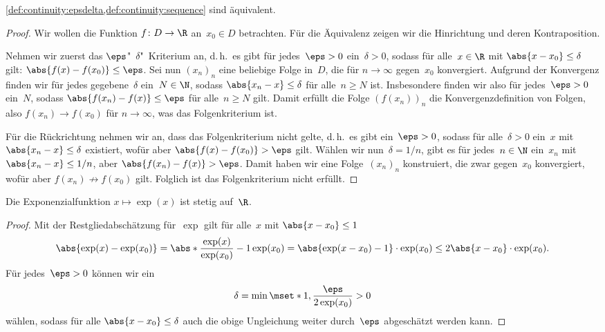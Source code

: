 \documentclass[a4paper]{article}
\begin{document}
\begin{theorem}
    \cref{def:continuity:epsdelta,def:continuity:sequence} sind äquivalent.
\end{theorem}

\begin{proof}
    Wir wollen die Funktion $f\colon D \to \R$ an~$x_0 \in D$ betrachten. Für die Äquivalenz zeigen wir die Hinrichtung und deren Kontraposition.

    Nehmen wir zuerst das $\eps$"~$\delta$"~Kriterium an, d.\,h.\ es gibt für jedes~$\eps > 0$ ein~$\delta > 0$, sodass für alle~$x \in \R$ mit $\abs{x-x_0} \leq \delta$ gilt: $\abs{f(x)-f(x_0)} \leq \eps$. Sei nun $(x_n)_n$ eine beliebige Folge in~$D$, die für $n \to \infty$ gegen~$x_0$ konvergiert. Aufgrund der Konvergenz finden wir für jedes gegebene~$\delta$ ein~$N \in \N$, sodass $\abs{x_n-x} \leq \delta$ für alle~$n \geq N$ ist. Insbesondere finden wir also für jedes~$\eps > 0$ ein~$N$, sodass $\abs{f(x_n)-f(x)} \leq \eps$ für alle~$n \geq N$ gilt. Damit erfüllt die Folge $(f(x_n))_n$ die Konvergenzdefinition von Folgen, also $f(x_n) \to f(x_0)$ für $n \to \infty$, was das Folgenkriterium ist.

    Für die Rückrichtung nehmen wir an, dass das Folgenkriterium nicht gelte, d.\,h.\ es gibt ein~$\eps > 0$, sodass für alle~$\delta > 0$ ein~$x$ mit $\abs{x_n-x} \leq \delta$ existiert, wofür aber $\abs{f(x)-f(x_0)} > \eps$ gilt. Wählen wir nun~$\delta = 1/n$, gibt es für jedes~$n \in \N$ ein~$x_n$ mit $\abs{x_n-x} \leq 1/n$, aber $\abs{f(x_n)-f(x)} > \eps$. Damit haben wir eine Folge~$(x_n)_n$ konstruiert, die zwar gegen~$x_0$ konvergiert, wofür aber $f(x_n) \not\to f(x_0)$ gilt. Folglich ist das Folgenkriterium nicht erfüllt.
\end{proof}

\begin{proposition}
    Die Exponenzialfunktion $x \mapsto \exp(x)$ ist stetig auf~$\R$.
\end{proposition}

\begin{proof}
    Mit der Restgliedabschätzung für~$\exp$ gilt für alle~$x$ mit $\abs{x-x_0} \leq 1$
    \begin{equation*}
        \abs{\exp(x)-\exp(x_0)} = \abs*{\frac{\exp(x)}{\exp(x_0)} - 1} \exp(x_0) = \abs{\exp(x-x_0)-1} \cdot \exp(x_0) \leq  2\abs{x-x_0} \cdot \exp(x_0).
    \end{equation*}
    Für jedes~$\eps > 0$ können wir ein
    \begin{equation*}
        \delta = \min\mset*{1, \frac{\eps}{2\exp(x_0)}} > 0
    \end{equation*}
    wählen, sodass für alle $\abs{x-x_0} \leq \delta$ auch die obige Ungleichung weiter durch~$\eps$ abgeschätzt werden kann.
\end{proof}
\end{document}
